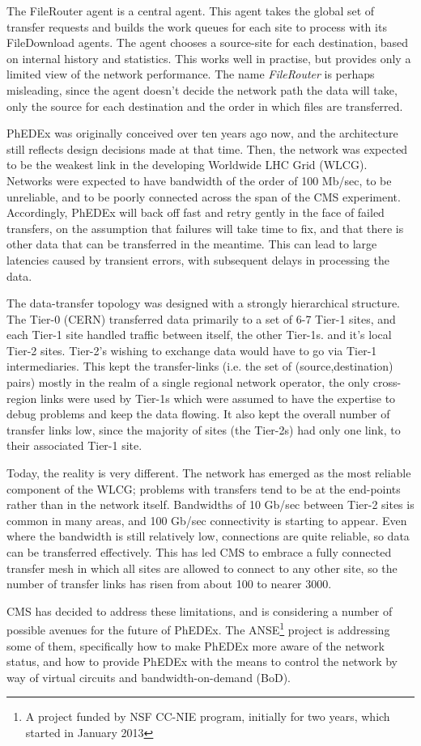 The FileRouter agent is a central agent. This agent takes the global set of transfer requests and builds the work queues for each site to process with its FileDownload agents. The agent chooses a source-site for each destination, based on internal history and statistics. This works well in practise, but provides only a limited view of the network performance. The name \emph{FileRouter} is perhaps misleading, since the agent doesn't decide the network path the data will take, only the source for each destination and the order in which files are transferred.

PhEDEx was originally conceived over ten years ago now, and the architecture still reflects design decisions made at that time. Then, the network was expected to be the weakest link in the developing Worldwide LHC Grid (WLCG)\cite{WLCG}. Networks were expected to have bandwidth of the order of 100 Mb/sec, to be unreliable, and to be poorly connected across the span of the CMS experiment. Accordingly, PhEDEx will back off fast and retry gently in the face of failed transfers, on the assumption that failures will take time to fix, and that there is other data that can be transferred in the meantime. This can lead to large latencies caused by transient errors, with subsequent delays in processing the data.

The data-transfer topology was designed with a strongly hierarchical structure. The Tier-0 (CERN) transferred data primarily to a set of 6-7 Tier-1 sites, and each Tier-1 site handled traffic between itself, the other Tier-1s. and it's local Tier-2 sites. Tier-2's wishing to exchange data would have to go via Tier-1 intermediaries. This kept the transfer-links (i.e. the set of (source,destination) pairs) mostly in the realm of a single regional network operator, the only cross-region links were used by Tier-1s which were assumed to have the expertise to debug problems and keep the data flowing. It also kept the overall number of transfer links low, since the majority of sites (the Tier-2s) had only one link, to their associated Tier-1 site.

Today, the reality is very different. The network has emerged as the most reliable component of the WLCG; problems with transfers tend to be at the end-points rather than in the network itself. Bandwidths of 10 Gb/sec between Tier-2 sites is common in many areas, and 100 Gb/sec connectivity is starting to appear. Even where the bandwidth is still relatively low, connections are quite reliable, so data can be transferred effectively. This has led CMS to embrace a fully connected transfer mesh in which all sites are allowed to connect to any other site, so the number of transfer links has risen from about 100 to nearer 3000.

CMS has decided to address these limitations, and is considering a number of possible avenues for the future of PhEDEx\cite{TW_DB_CHEP13}. The ANSE\footnote{A project funded by NSF CC-NIE program, initially for two years, which started in January 2013}\cite{ANSE} project is addressing some of them, specifically how to make PhEDEx more aware of the network status, and how to provide PhEDEx with the means to control the network by way of virtual circuits and bandwidth-on-demand (BoD).